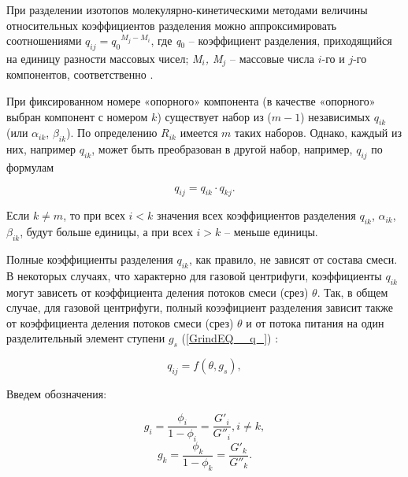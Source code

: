 При разделении изотопов молекулярно-кинетическими методами величины относительных коэффициентов разделения можно аппроксимировать соотношениями $q_{ij} =q_{0} {}^{M_{j} -M_{i} }$, где \textit{q}${}_{0}$ – коэффициент разделения, приходящийся на единицу разности массовых чисел; \textit{M${}_{i}$, M${}_{j}$} – массовые числа $i$-го и $j$-го компонентов, соответственно \cite{sulaberidzeTeoriyaKaskadovDlya2011}.

При фиксированном номере «опорного» компонента (в качестве «опорного» выбран компонент с номером $k$) существует набор из ($m-1$) независимых $q_{ik} $ (или $\alpha _{ik} $, $\beta _{ik}$). По определению $R_{ik} $ имеется $m$ таких наборов. Однако, каждый из них, например $q_{ik} $, может быть преобразован в другой набор, например, $q_{ij}$ по формулам

\begin{equation} \label{GrindEQ__1_12_} 
  q_{ij} =q_{ik} \cdot q_{kj} .            
\end{equation} 

Если $k\ne m$, то при всех $i<k$ значения всех коэффициентов разделения $q_{ik} $, $\alpha _{ik} $, $\beta _{ik} $, будут больше единицы, а при всех $i>k$ -- меньше единицы.

Полные коэффициенты разделения $q_{ik} $, как правило, не зависят от состава смеси. В некоторых случаях, что характерно для газовой центрифуги, коэффициенты $q_{ik} $ могут зависеть от коэффициента деления потоков смеси (срез) $\theta $. Так, в общем случае, для газовой центрифуги, полный коээфициент разделения зависит также от коэффициента деления потоков смеси (срез) $\theta$ и от потока питания на один разделительный элемент ступени $g_{s} $ (\ref{GrindEQ__q_}) \cite{mustafinObjectiveFunctionOptimization2019}:

\begin{equation} \label{GrindEQ__q_} 
  q_{ij} = f(\theta, g_{s}),              
\end{equation}

Введем обозначения:

\begin{equation} \label{GrindEQ__1_13_} 
  g_{i} =\frac{\phi _{i} }{1-\phi _{i} } =\frac{G'_{i} }{G''_{i} } , i\ne k, 
  \end{equation} 
  \begin{equation} \label{GrindEQ__1_14_} 
  g_{k} =\frac{\phi _{k} }{1-\phi _{k} } =\frac{G'_{k} }{G''_{k} } .           
\end{equation} 

